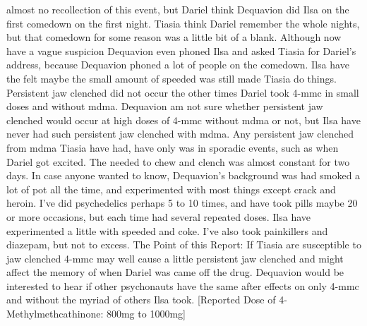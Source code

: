 \documentclass[12pt]{book}
\begin{document}
almost no recollection of this event, but Dariel think Dequavion did Ilsa on the first comedown on the first night. Tiasia think Dariel remember the whole nights, but that comedown for some reason was a little bit of a blank. Although now have a vague suspicion Dequavion even phoned Ilsa and asked Tiasia for Dariel's address, because Dequavion phoned a lot of people on the comedown. Ilsa have the felt maybe the small amount of speeded was still made Tiasia do things. Persistent jaw clenched did not occur the other times Dariel took 4-mmc in small doses and without mdma. Dequavion am not sure whether persistent jaw clenched would occur at high doses of 4-mmc without mdma or not, but Ilsa have never had such persistent jaw clenched with mdma. Any persistent jaw clenched from mdma Tiasia have had, have only was in sporadic events, such as when Dariel got excited. The needed to chew and clench was almost constant for two days. In case anyone wanted to know, Dequavion's background was had smoked a lot of pot all the time, and experimented with most things except crack and heroin. I've did psychedelics perhaps 5 to 10 times, and have took pills maybe 20 or more occasions, but each time had several repeated doses. Ilsa have experimented a little with speeded and coke. I've also took painkillers and diazepam, but not to excess. The Point of this Report: If Tiasia are susceptible to jaw clenched 4-mmc may well cause a little persistent jaw clenched and might affect the memory of when Dariel was came off the drug. Dequavion would be interested to hear if other psychonauts have the same after effects on only 4-mmc and without the myriad of others Ilsa took. [Reported Dose of 4-Methylmethcathinone: 800mg to 1000mg]
\end{document}
